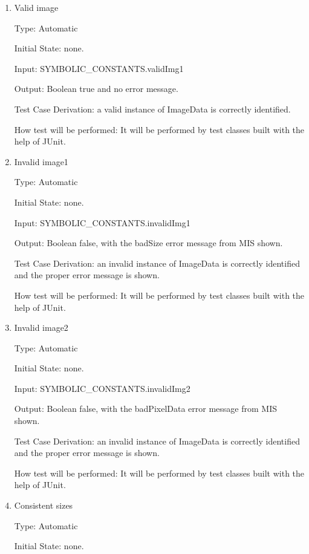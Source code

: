 \documentclass[12pt, titlepage]{article}
\begin{document}
\begin{enumerate}

\item{Valid image\\}

Type: Automatic
					
Initial State: none.
					
Input: SYMBOLIC\_CONSTANTS.validImg1
					
Output: Boolean true and no error message.

Test Case Derivation: a valid instance of ImageData is correctly identified.

How test will be performed: It will be performed by test classes built with the
help of JUnit.

\item{Invalid image1\\}

Type: Automatic
					
Initial State: none.
					
Input: SYMBOLIC\_CONSTANTS.invalidImg1
					
Output: Boolean false, with the badSize error message from MIS shown.

Test Case Derivation: an invalid instance of ImageData is correctly identified
and the proper error message is shown.

How test will be performed: It will be performed by test classes built with the
help of JUnit.

\item{Invalid image2\\}

Type: Automatic
					
Initial State: none.
					
Input: SYMBOLIC\_CONSTANTS.invalidImg2
					
Output: Boolean false, with the badPixelData error message from MIS shown.

Test Case Derivation: an invalid instance of ImageData is correctly identified
and the proper error message is shown.

How test will be performed: It will be performed by test classes built with the
help of JUnit.

\item{Consistent sizes\\}

Type: Automatic
					
Initial State: none.
					

\end{enumerate}
\end{document}
